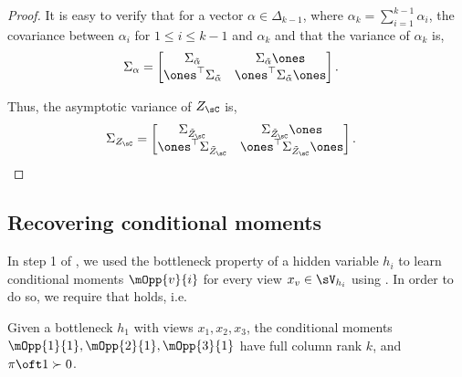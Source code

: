 \begin{proof}
It is easy to verify that for a vector $\alpha \in \Delta_{k-1}$, where
  $\alpha_k = \sum_{i=1}^{k-1} \alpha_i$, the covariance between
  $\alpha_i$ for $1 \le i \le k-1$ and $\alpha_k$ and that the variance
  of $\alpha_k$ is,
\begin{align*}
    \Sigma_{\alpha} &= 
    \begin{bmatrix}
    \Sigma_{\tilde \alpha} & \Sigma_{\tilde \alpha} \ones \\
    \ones^\top \Sigma_{\tilde \alpha} & \ones^\top \Sigma_{\tilde \alpha} \ones
    \end{bmatrix}.
\end{align*}

Thus, the asymptotic variance of $Z_\sC$ is,
\begin{align*}
    \Sigma_{Z_\sC} &= 
    \begin{bmatrix}
    \Sigma_{\tilde Z_\sC} & \Sigma_{\tilde Z_\sC} \ones \\
    \ones^\top \Sigma_{\tilde Z_\sC} & \ones^\top \Sigma_{\tilde Z_\sC} \ones
    \end{bmatrix}.
\end{align*}


\end{proof}

\subsection{Recovering conditional moments}

In step 1 of \LearnMarginals, we used the bottleneck property of a hidden
  variable $h_i$ to learn conditional moments $\mOpp{v}{i}$ for every
  view $x_v \in \sV_{h_i}$ using \TensorFactorize. 
In order to do so, we require that  holds, i.e.
\begin{assumption*}[1]
  Given a bottleneck $h_1$ with views $x_1, x_2, x_3$, the conditional
  moments $\mOpp{1}{1}, \mOpp{2}{1}, \mOpp{3}{1}$ have full column rank
  $k$, and $\pi\oft 1 \succ 0$.
\end{assumption*}

